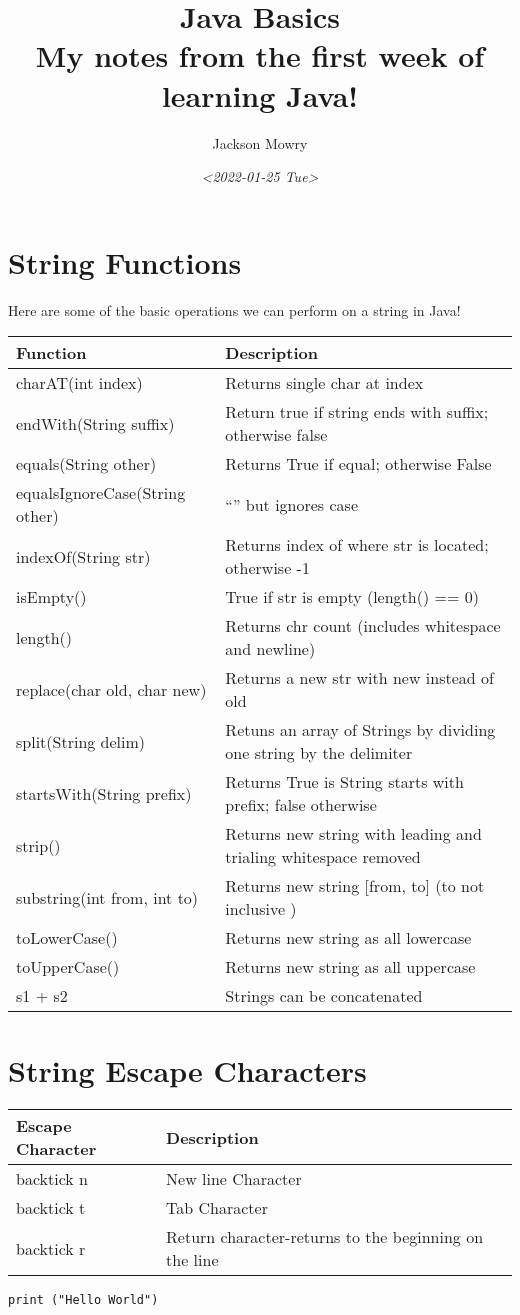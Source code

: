 \documentclass[letterpaper, 11pt]{article}
\author{Jackson Mowry}
\date{\textit{<2022-01-25 Tue>}}
\title{Java Basics\\\medskip
\large My notes from the first week of learning Java!}
\begin{document}
\maketitle
\tableofcontents


\section{String Functions}
\label{sec:orgdc8da0c}
Here are some of the basic operations we can perform on a string in Java!
\begin{center}
\begin{tabular}{ll}
Function & Description\\
\hline
charAT(int index) & Returns single char at index\\
endWith(String suffix) & Return true if string ends with suffix; otherwise false\\
equals(String other) & Returns True if equal; otherwise False\\
equalsIgnoreCase(String other) & ``'' but ignores case\\
indexOf(String str) & Returns index of where str is located; otherwise -1\\
isEmpty() & True if str is empty (length() == 0)\\
length() & Returns chr count (includes whitespace and newline)\\
replace(char old, char new) & Returns a new str with new instead of old\\
split(String delim) & Retuns an array of Strings by dividing one string by the delimiter\\
startsWith(String prefix) & Returns True is String starts with prefix; false otherwise\\
strip() & Returns new string with leading and trialing whitespace removed\\
substring(int from, int to) & Returns new string [from, to] (to not inclusive )\\
toLowerCase() & Returns new string as all lowercase\\
toUpperCase() & Returns new string as all uppercase\\
s1 + s2 & Strings can be concatenated\\
\end{tabular}
\end{center}

\section{String Escape Characters}
\label{sec:orgd1ad90e}
\begin{center}
\begin{tabular}{ll}
Escape Character & Description\\
\hline
backtick n & New line Character\\
backtick t & Tab Character\\
backtick r & Return character-returns to the beginning on the line\\
\end{tabular}
\end{center}

\lstset{language=<python>,label= ,caption= ,captionpos=b,numbers=none}
\begin{lstlisting}
print ("Hello World")
\end{lstlisting}
\end{document}
